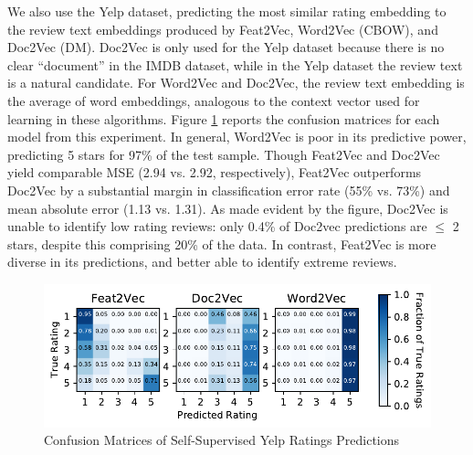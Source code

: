 \documentclass{article}
\begin{document}
We also use the Yelp dataset, predicting the most similar rating embedding to the review text embeddings produced by Feat2Vec, Word2Vec (CBOW), and Doc2Vec (DM).
Doc2Vec is only used for the Yelp dataset because there is no clear ``document'' in the IMDB dataset, while in the Yelp dataset the review text is a natural candidate.
For Word2Vec and Doc2Vec, the review text embedding is the average of word embeddings, analogous to the context vector used for learning in these algorithms. Figure \ref{fig:confmat} reports the confusion matrices for each model from this experiment.
In general, Word2Vec is poor in its predictive power, predicting 5 stars for 97\% of the test sample.
Though Feat2Vec and Doc2Vec yield comparable MSE (2.94 vs. 2.92, respectively), Feat2Vec outperforms Doc2Vec by a substantial margin in classification error rate (55\% vs. 73\%) and mean absolute error (1.13 vs. 1.31).
As made evident by the figure, Doc2Vec is unable to identify low rating reviews: only 0.4\% of Doc2vec predictions are $\leq$ 2 stars, despite this comprising 20\% of the data. In contrast, Feat2Vec is more diverse in its predictions, and better able to identify extreme reviews.

\begin{figure}
\includegraphics[width=.5\textwidth]{../paper/output/yelp/text_rating_confusionmat_numbers}
\caption{Confusion Matrices of Self-Supervised Yelp Ratings Predictions}
\label{fig:confmat}
\end{figure}
\end{document}
